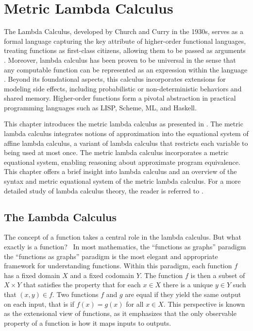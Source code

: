 \chapter{Metric Lambda Calculus}

The Lambda Calculus, developed by Church and Curry in the 1930s, serves as a formal language capturing the key attribute of higher-order functional languages, treating functions as first-class citizens, allowing them to be passed as arguments \cite{barendregt1984lambda}.  Moreover, lambda calculus has been proven to be universal in the sense that any computable function can be represented as an expression within the language \cite{bernays1936alonzo} . Beyond its foundational aspects, this calculus incorporates extensions for modeling side effects, including probabilistic or non-deterministic behaviors and shared memory.  Higher-order functions form a pivotal abstraction in practical programming languages such as LISP, Scheme, ML, and Haskell.


This chapter introduces the metric lambda calculus as presented in \cite{dahlqvist2022syntactic}. The metric lambda calculus integrates notions of
approximation into the equational system of affine lambda calculus, a variant of lambda calculus that restricts each variable to being used at most once. The metric lambda calculus incorporates a metric equational system, enabling reasoning about approximate program equivalence. This chapter offers a brief insight into lambda calculus and an overview of the syntax and metric equational system of the metric lambda calculus. For a more detailed study of lambda calculus theory, the reader is referred to \cite{barendregt1984lambda}.


\section{The Lambda Calculus}

The concept of a function takes a central role in the lambda calculus. But what exactly is a function?  In most mathematics, the “functions as graphs” paradigm the “functions as graphs” paradigm is the most elegant and appropriate framework for understanding functions. Within this paradigm, each function $f$ has a fixed domain $X$ and a fixed codomain $Y$. The function $f$ is then a subset of $X \times Y$ that satisfies the property that for each $x \in X$ there is a unique $y \in Y$ such that $(x,y) \in f$. Two functions $f$ and $g$ are equal if they yield the same output on each input, that is if $f(x) = g(x)$ for all $x \in X$. This perspective is known as the extensional view of functions, as it emphasizes that the only observable property of a function is how it maps inputs to outputs.

